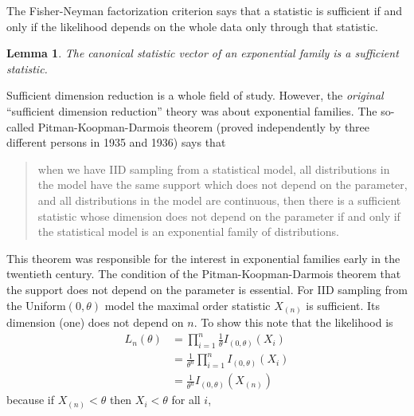 \documentclass[12pt]{article}
\newtheorem{lem}{Lemma}
\begin{document}
The Fisher-Neyman factorization criterion \citep[Corollary 1 of Chapter 2]{lehmann1959testing} says that a statistic is sufficient if and only if the likelihood depends on the whole data only through that statistic. %

\begin{lem}
The canonical statistic vector of an exponential family is a sufficient statistic.
\end{lem}


\vspace{0.5cm} Sufficient dimension reduction is a whole field of study. However, the \emph{original} ``sufficient dimension reduction'' theory was about exponential families. The so-called Pitman-Koopman-Darmois theorem (proved independently by three different persons in 1935 and 1936) says that 
\begin{quote}
when we have IID sampling from a statistical model, all distributions in the model have the same support which does not depend on the parameter, and all distributions in the model are continuous, then there is a sufficient statistic whose dimension does not depend on the parameter if and only if the statistical model is an exponential family of distributions.	
\end{quote}
This theorem was responsible for the interest in exponential families early in the twentieth century. The condition of the Pitman-Koopman-Darmois theorem that the support does not depend on the parameter is essential. For IID sampling from the Uniform$(0,\theta)$ model the maximal order statistic $X_{(n)}$ is sufficient. Its dimension (one) does not depend on $n$. To show this note that the likelihood is
\begin{align*}
  L_n(\theta) &= \prod_{i=1}^n \frac{1}{\theta} I_{(0,\theta)}(X_i) \\
    &= \frac{1}{\theta^n} \prod_{i=1}^n I_{(0,\theta)}(X_i) \\
    &= \frac{1}{\theta^n} I_{(0,\theta)}(X_{(n)})
\end{align*}
because if $X_{(n)} < \theta$ then $X_i < \theta$ for all $i$,
\end{document}

